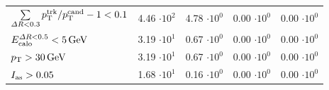 \begin{table}[!h]
{\begin{tabular}{|l|c|c|c|c|}
$\sum \limits_{\Delta R < 0.3} p_{\text{T}}^{\text{trk}}/p_{\text{T}}^{\text{cand}} - 1 < 0.1$              & 4.46 $\cdot10^{2 }$ & 4.78 $\cdot10^{0 }$ & 0.00 $\cdot10^{0 }$ & 0.00 $\cdot10^{0 }$ \\
$E^{\Delta R<0.5}_{\text{calo}}<5\,\text{Ge}\kern-0.06667em\text{V}$                                                                            & 3.19 $\cdot10^{1 }$ & 0.67 $\cdot10^{0 }$ & 0.00 $\cdot10^{0 }$ & 0.00 $\cdot10^{0 }$ \\
\midrule
$p_{\text{T}}>30\,\text{Ge}\kern-0.06667em\text{V}$                                                                              & 3.19 $\cdot10^{1 }$ & 0.67 $\cdot10^{0 }$ & 0.00 $\cdot10^{0 }$ & 0.00 $\cdot10^{0 }$ \\
$I_{\text{as}}>0.05$                                                                               & 1.68 $\cdot10^{1 }$ & 0.16 $\cdot10^{0 }$ & 0.00 $\cdot10^{0 }$ & 0.00 $\cdot10^{0 }$ \\
\bottomrule
\end{tabular}}
\end{table}  

